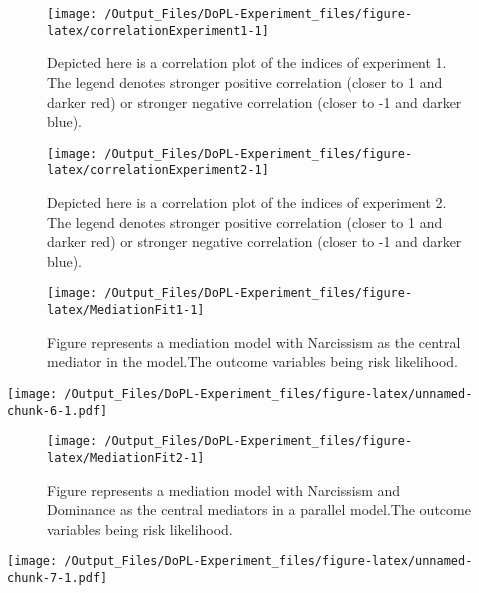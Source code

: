 \documentclass[
  donotrepeattitle,doc, 12pt, a4paper,floatsintext]{apa7}
\begin{document}
\begin{landscape}
\begin{figure}

{\centering \texttt{[image: /Output\_Files/DoPL-Experiment\_files/figure-latex/correlationExperiment1-1]} 

}

\caption{Depicted here is a correlation plot of the indices of experiment 1. The legend denotes stronger positive correlation (closer to 1 and darker red) or stronger negative correlation (closer to -1 and darker blue).}\label{fig:correlationExperiment1}
\end{figure}
\newpage
\begin{figure}

{\centering \texttt{[image: /Output\_Files/DoPL-Experiment\_files/figure-latex/correlationExperiment2-1]} 

}

\caption{Depicted here is a correlation plot of the indices of experiment 2. The legend denotes stronger positive correlation (closer to 1 and darker red) or stronger negative correlation (closer to -1 and darker blue).}\label{fig:correlationExperiment2}
\end{figure}
\end{landscape}
\newpage
\begin{figure}

{\centering \texttt{[image: /Output\_Files/DoPL-Experiment\_files/figure-latex/MediationFit1-1]} 

}

\caption{Figure represents a mediation model with Narcissism as the central mediator in the model.The outcome variables being risk likelihood.}\label{fig:MediationFit1}
\end{figure}

\texttt{[image: /Output\_Files/DoPL-Experiment\_files/figure-latex/unnamed-chunk-6-1.pdf]}

\begin{figure}

{\centering \texttt{[image: /Output\_Files/DoPL-Experiment\_files/figure-latex/MediationFit2-1]} 

}

\caption{Figure represents a mediation model with Narcissism and Dominance as the central mediators in a parallel model.The outcome variables being risk likelihood.}\label{fig:MediationFit2}
\end{figure}

\texttt{[image: /Output\_Files/DoPL-Experiment\_files/figure-latex/unnamed-chunk-7-1.pdf]}
\end{document}
